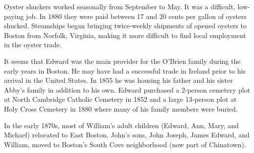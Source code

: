 Oyster shuckers worked seasonally from September to May. It was a difficult, low-paying job. In 1880 they were paid between 17 and 20 cents per gallon of oysters shucked. Steamships began bringing twice-weekly shipments of opened oysters to Boston from Norfolk, Virginia, making it more difficult to find local employment in the oyster trade.\cite{Ingersoll:30}

It seems that Edward was the main provider for the O'Brien family during the early years in Boston. He may have had a successful trade in Ireland prior to his arrival in the United States. In 1855 he was housing his father and his sister Abby's family in addition to his own.\cite{Census1855William:1} Edward purchased a 2-person cemetery plot at North Cambridge Catholic Cemetery in 1852\cite{CarolGordon:1} and a large 13-person plot at Holy Cross Cemetery in 1880\cite{HolyCrossPlotEdward:1} where many of his family members were buried.

In the early 1870s, most of William's adult children (Edward, Ann, Mary, and Michael) relocated to East Boston. John's sons, John Joseph, James Edward, and William, moved to Boston's South Cove neighborhood (now part of Chinatown).


